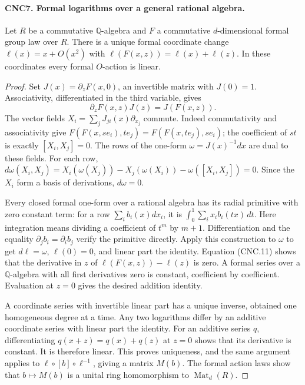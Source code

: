 \documentclass[11pt,a4paper]{article}
\numberwithin{equation}{section}
\theoremstyle{remark}\newtheorem{remark}[theorem]{Remark}
\begin{document}
\paragraph{CNC7. Formal logarithms over a general rational algebra.}
\label{claim:CNC7}
Let \(R\) be a commutative \(\mathbb Q\)-algebra and \(F\) a
commutative \(d\)-dimensional formal group law over \(R\).
There is a unique formal coordinate change \(\ell(x)=x+O(x^2)\)
with
\(\ell(F(x,z))=\ell(x)+\ell(z)\).  In these coordinates every
formal \(O\)-action is linear.
\begin{proof}
Set \(J(x)=\partial_zF(x,0)\), an invertible matrix with
\(J(0)=1\).  Associativity, differentiated in the third variable,
gives
\[
 \partial_zF(x,z)J(z)=J(F(x,z)).                              \tag{CNC.11}
\]
The vector fields
\(X_i=\sum_jJ_{ji}(x)\partial_{x_j}\) commute.  Indeed
commutativity and associativity give
\(F(F(x,se_i),te_j)=F(F(x,te_j),se_i)\); the coefficient of
\(st\) is exactly \([X_i,X_j]=0\).
The rows of the one-form \(\omega=J(x)^{-1}dx\) are dual to
these fields.  For each row,
\(d\omega(X_i,X_j)=X_i(\omega(X_j))-X_j(\omega(X_i))
-\omega([X_i,X_j])=0\).  Since the \(X_i\) form a basis of
derivations, \(d\omega=0\).

Every closed formal one-form over a rational algebra has its radial
primitive with zero constant term: for a row \(\sum_i b_i(x)dx_i\),
it is
\(\int_0^1\sum_i x_i b_i(tx)\,dt\).
Here integration means dividing a coefficient of \(t^m\) by
\(m+1\).  Differentiation and the equality
\(\partial_jb_i=\partial_ib_j\) verify the primitive directly.
Apply this construction to \(\omega\) to get \(d\ell=\omega\),
\(\ell(0)=0\), and linear part the identity.
Equation (CNC.11) shows that the derivative in \(z\) of
\(\ell(F(x,z))-\ell(z)\) is zero.  A formal series over a
\(\mathbb Q\)-algebra with all first derivatives zero is constant,
coefficient by coefficient.  Evaluation at \(z=0\) gives the desired
addition identity.

A coordinate series with invertible linear part has a unique inverse,
obtained one homogeneous degree at a time.  Any two logarithms differ
by an additive coordinate series with linear part the identity.
For an additive series \(q\), differentiating
\(q(x+z)=q(x)+q(z)\) at \(z=0\) shows that its derivative is
constant.  It is therefore linear.  This proves uniqueness, and the
same argument applies to
\(\ell\circ[b]\circ\ell^{-1}\), giving a matrix \(M(b)\).
The formal action laws show that \(b\mapsto M(b)\) is a unital
ring homomorphism to \(\operatorname{Mat}_d(R)\).
\end{proof}
\end{document}
